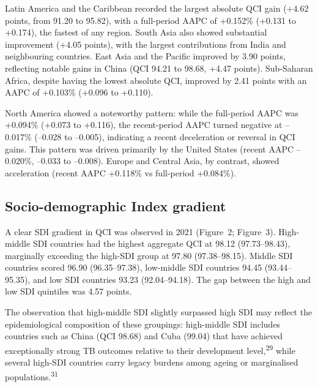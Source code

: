 \documentclass[12pt]{article}
\begin{document}
Latin America and the Caribbean recorded the largest absolute QCI gain (+4.62 points, from 91.20 to 95.82), with a full-period AAPC of +0.152\% (+0.131 to +0.174), the fastest of any region. South Asia also showed substantial improvement (+4.05 points), with the largest contributions from India and neighbouring countries. East Asia and the Pacific improved by 3.90 points, reflecting notable gains in China (QCI 94.21 to 98.68, +4.47 points). Sub-Saharan Africa, despite having the lowest absolute QCI, improved by 2.41 points with an AAPC of +0.103\% (+0.096 to +0.110).

North America showed a noteworthy pattern: while the full-period AAPC was +0.094\% (+0.073 to +0.116), the recent-period AAPC turned negative at --0.017\% (--0.028 to --0.005), indicating a recent deceleration or reversal in QCI gains. This pattern was driven primarily by the United States (recent AAPC --0.020\%, --0.033 to --0.008). Europe and Central Asia, by contrast, showed acceleration (recent AAPC +0.118\% vs full-period +0.084\%).

\subsection{Socio-demographic Index gradient}

A clear SDI gradient in QCI was observed in 2021 (Figure~2; Figure~3). High-middle SDI countries had the highest aggregate QCI at 98.12 (97.73--98.43), marginally exceeding the high-SDI group at 97.80 (97.38--98.15). Middle SDI countries scored 96.90 (96.35--97.38), low-middle SDI countries 94.45 (93.44--95.35), and low SDI countries 93.23 (92.04--94.18). The gap between the high and low SDI quintiles was 4.57 points.

The observation that high-middle SDI slightly surpassed high SDI may reflect the epidemiological composition of these groupings: high-middle SDI includes countries such as China (QCI 98.68) and Cuba (99.04) that have achieved exceptionally strong TB outcomes relative to their development level,\textsuperscript{29} while several high-SDI countries carry legacy burdens among ageing or marginalised populations.\textsuperscript{31}
\end{document}
